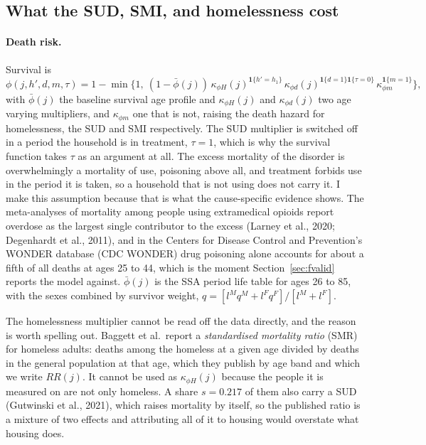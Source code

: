 \documentclass[10pt]{article}
\begin{document}
\subsection{What the SUD, SMI, and homelessness cost}\label{sec:fcosts}

\paragraph{Death risk.}\label{sec:fdeath} Survival is
\begin{equation}\label{eq:fsurv}
\phi(j,h',d,m,\tau)=1-\min\Big\{1,\ (1-\bar\phi(j))\,
\kappa_{\phi H}(j)^{\mathbf{1}\{h'=h_1\}}\,
\kappa_{\phi d}(j)^{\mathbf{1}\{d=1\}\mathbf{1}\{\tau=0\}}\,
\kappa_{\phi m}^{\mathbf{1}\{m=1\}}\Big\},
\end{equation}
with $\bar\phi(j)$ the baseline survival age profile and
$\kappa_{\phi H}(j)$ and $\kappa_{\phi d}(j)$ two age varying multipliers,
and $\kappa_{\phi m}$ one that is not,
raising the death hazard for homelessness, the SUD and SMI
respectively. The SUD multiplier is switched off in a period the
household is in treatment, $\tau=1$, which is why the survival function takes $\tau$
as an argument at all. The excess mortality of the disorder is
overwhelmingly a mortality of use, poisoning above all, and treatment forbids use
in the period it is taken, so a household that is not using does not carry it.
I make this assumption because that is what the cause-specific evidence
shows. The meta-analyses of mortality among people using extramedical opioids report
overdose as the largest single contributor to the excess (Larney et al., 2020;
Degenhardt et al., 2011), and in the Centers for Disease Control and Prevention's WONDER database (CDC WONDER) drug poisoning alone accounts for about
a fifth of all deaths at ages 25 to 44, which is the moment
Section~\ref{sec:fvalid} reports the model against.
$\bar\phi(j)$ is the SSA period life table for ages 26 to 85, with the sexes
combined by survivor weight, $q=[l^Mq^M+l^Fq^F]/[l^M+l^F]$.

The homelessness multiplier cannot be read off the data directly, and
the reason is worth spelling out. Baggett et al.\ report a \emph{standardised
mortality ratio} (SMR) for homeless adults: deaths among the homeless at a given
age divided by deaths in the general population at that age, which they publish
by age band and which we write $RR(j)$. It cannot be used as $\kappa_{\phi H}(j)$
because the people it is measured on are not only homeless. A share $s=0.217$ of
them also carry a SUD (Gutwinski et al., 2021), which raises mortality by
itself, so the published ratio
is a mixture of two effects and attributing all of it to housing would overstate
what housing does.
\end{document}
